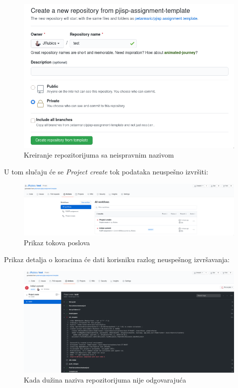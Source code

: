 \documentclass[12pt]{report}
\begin{document}
\begin{figure}[H]
    \centering
    \includegraphics[width=0.7\linewidth]{images/17.png}
    \caption{Kreiranje repozitorijuma sa neispravnim nazivom}
\end{figure}

U tom slučaju će se \textit{Project create} tok podataka neuspešno izvršiti:

\begin{figure}[H]
    \centering
    \includegraphics[width=\linewidth]{images/18.png}
    \caption{Prikaz tokova poslova}
\end{figure}

Prikaz detalja o koracima će dati korisniku razlog neuspešnog izvršavanja:

\begin{figure}[H]
    \centering
    \includegraphics[width=\linewidth]{images/19.png}
    \caption{Kada dužina naziva repozitorijuma nije odgovarajuća}
\end{figure}
\end{document}
